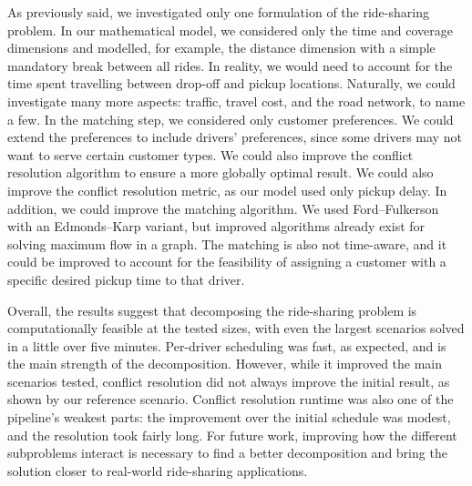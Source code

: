 As previously said, we investigated only one formulation of the ride-sharing problem. In our mathematical model, we considered only the time and coverage dimensions and modelled, for example, the distance dimension with a simple mandatory break between all rides. In reality, we would need to account for the time spent travelling between drop-off and pickup locations. Naturally, we could investigate many more aspects: traffic, travel cost, and the road network, to name a few. In the matching step, we considered only customer preferences. We could extend the preferences to include drivers' preferences, since some drivers may not want to serve certain customer types. We could also improve the conflict resolution algorithm to ensure a more globally optimal result. We could also improve the conflict resolution metric, as our model used only pickup delay. In addition, we could improve the matching algorithm. We used Ford–Fulkerson with an Edmonds–Karp variant, but improved algorithms already exist for solving maximum flow in a graph. The matching is also not time-aware, and it could be improved to account for the feasibility of assigning a customer with a specific desired pickup time to that driver.

Overall, the results suggest that decomposing the ride-sharing problem is computationally feasible at the tested sizes, with even the largest scenarios solved in a little over five minutes. Per-driver scheduling was fast, as expected, and is the main strength of the decomposition. However, while it improved the main scenarios tested, conflict resolution did not always improve the initial result, as shown by our reference scenario. Conflict resolution runtime was also one of the pipeline's weakest parts: the improvement over the initial schedule was modest, and the resolution took fairly long. For future work, improving how the different subproblems interact is necessary to find a better decomposition and bring the solution closer to real-world ride-sharing applications.
